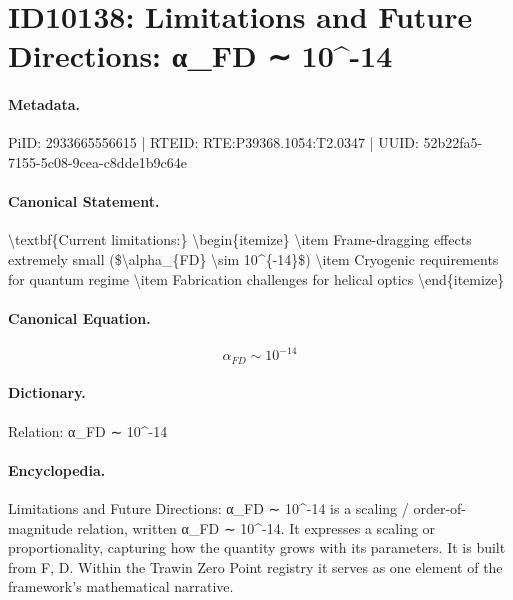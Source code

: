 \section*{ID10138: Limitations and Future Directions: α\_FD ∼ 10\textasciicircum{}-14}
\paragraph{Metadata.}
PiID: 2933665556615 | RTEID: RTE:P39368.1054:T2.0347 | UUID: 52b22fa5-7155-5c08-9cea-c8dde1b9c64e

\paragraph{Canonical Statement.}
\textbackslash{}textbf\{Current limitations:\} \textbackslash{}begin\{itemize\} \textbackslash{}item Frame-dragging effects extremely small (\$\textbackslash{}alpha\_\{FD\} \textbackslash{}sim 10\textasciicircum{}\{-14\}\$) \textbackslash{}item Cryogenic requirements for quantum regime \textbackslash{}item Fabrication challenges for helical optics \textbackslash{}end\{itemize\}

\paragraph{Canonical Equation.}
\[
\alpha_{FD} \sim 10^{-14}
\]

\paragraph{Dictionary.}
Relation: α\_FD ∼ 10\textasciicircum{}-14

\paragraph{Encyclopedia.}
Limitations and Future Directions: α\_FD ∼ 10\textasciicircum{}-14 is a scaling / order-of-magnitude relation, written α\_FD ∼ 10\textasciicircum{}-14. It expresses a scaling or proportionality, capturing how the quantity grows with its parameters. It is built from F, D. Within the Trawin Zero Point registry it serves as one element of the framework's mathematical narrative.
